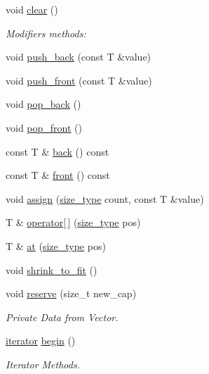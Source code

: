 \begin{DoxyCompactItemize}
\item 
void \hyperlink{classsc_1_1vector_a17c6d622cf64278d03feac9c38fa3684}{clear} ()
\begin{DoxyCompactList}\small\item\em Modifiers methods\+: \end{DoxyCompactList}\item 
void \hyperlink{classsc_1_1vector_a5b4a8c72d19d0bdab794e495fb1e334d}{push\+\_\+back} (const T \&value)
\item 
void \hyperlink{classsc_1_1vector_a013daac15aada32590d4372c0cbc610a}{push\+\_\+front} (const T \&value)
\item 
void \hyperlink{classsc_1_1vector_a3dbc8155ac3737f9a9ffe7f454a8f321}{pop\+\_\+back} ()
\item 
void \hyperlink{classsc_1_1vector_aad4717b5827454557f7c9e5c3edd5a7e}{pop\+\_\+front} ()
\item 
const T \& \hyperlink{classsc_1_1vector_a90e25706d3a6e4b72db0f5ad35a63abf}{back} () const
\item 
const T \& \hyperlink{classsc_1_1vector_a85da6164a082030bd04de354d657da0d}{front} () const
\item 
void \hyperlink{classsc_1_1vector_aaa1279dfc147a016a70a65faa7d89c23}{assign} (\hyperlink{classsc_1_1vector_a48bf37ba1a6d0c13504414d86e27c399}{size\+\_\+type} count, const T \&value)
\item 
T \& \hyperlink{classsc_1_1vector_ab93846461528695f38e1d143231b0653}{operator\mbox{[}$\,$\mbox{]}} (\hyperlink{classsc_1_1vector_a48bf37ba1a6d0c13504414d86e27c399}{size\+\_\+type} pos)
\item 
T \& \hyperlink{classsc_1_1vector_ab6fc47c9994c531ff8d0a0b46fe422f8}{at} (\hyperlink{classsc_1_1vector_a48bf37ba1a6d0c13504414d86e27c399}{size\+\_\+type} pos)
\item 
void \hyperlink{classsc_1_1vector_aaeb01dacb26f39fb08cffc6f274284fd}{shrink\+\_\+to\+\_\+fit} ()
\item 
void \hyperlink{classsc_1_1vector_afd98588509a1f15ce5621735f69b01bf}{reserve} (size\+\_\+t new\+\_\+cap)
\begin{DoxyCompactList}\small\item\em Private Data from Vector. \end{DoxyCompactList}\item 
\hyperlink{classsc_1_1vector_1_1iterator}{iterator} \hyperlink{classsc_1_1vector_aefba74791ea0f1ab9b9ad95d35bf9497}{begin} ()
\begin{DoxyCompactList}\small\item\em Iterator Methods. \end{DoxyCompactList}\item 

\end{DoxyCompactItemize}

